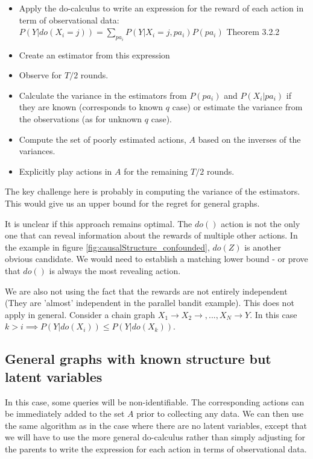 \begin{itemize}
\item Apply the do-calculus to write an expression for the reward of each action in term of observational data: $P(Y|do(X_i=j)) = \sum_{pa_i} P(Y|X_i = j,pa_i)P(pa_i)$ \cite{Pearl2000} Theorem 3.2.2
\item Create an estimator from this expression
\item Observe for $T/2$ rounds.
\item Calculate the variance in the estimators from $P(pa_i)$ and $P(X_i|pa_i)$ if they are known (corresponds to known $q$ case) or estimate the variance from the observations (as for unknown $q$ case). 
\item Compute the set of poorly estimated actions, $A$ based on the inverses of the variances.
\item Explicitly play actions in $A$ for the remaining $T/2$ rounds.
\end{itemize}

The key challenge here is probably in computing the variance of the estimators. This would give us an upper bound for the regret for general graphs. 

It is unclear if this approach remains optimal. The $do()$ action is not the only one that can reveal information about the rewards of multiple other actions. In the example in figure \ref{fig:causalStructure_confounded}, $do(Z)$ is another obvious candidate. We would need to establish a matching lower bound - or prove that $do()$ is always the most revealing action. 

We are also not using the fact that the rewards are not entirely independent (They are 'almost' independent in the parallel bandit example). This does not apply in general. Consider a chain graph $X_1 \rightarrow X_2 \rightarrow, ..., X_N \rightarrow Y$. In this case $k > i \implies P(Y|do(X_i)) \leq P(Y|do(X_k))$.  


\subsection{General graphs with known structure but latent variables}
In this case, some queries will be non-identifiable. The corresponding actions can be immediately added to the set $A$ prior to collecting any data. We can then use the same algorithm as in the case where there are no latent variables, except that we will have to use the more general do-calculus rather than simply adjusting for the parents to write the expression for each action in terms of observational data. 

